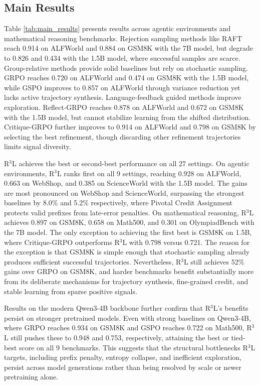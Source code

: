 \documentclass{article} %
\theoremstyle{definition}
\theoremstyle{remark}
\begin{document}
\subsection{Main Results}
Table \ref{tab:main_results} presents results across agentic environments and mathematical reasoning benchmarks. Rejection sampling methods like RAFT reach 0.914 on ALFWorld and 0.884 on GSM8K with the 7B model, but degrade to 0.826 and 0.434 with the 1.5B model, where successful samples are scarce. Group-relative methods provide solid baselines but rely on stochastic sampling. GRPO reaches 0.720 on ALFWorld and 0.474 on GSM8K with the 1.5B model, while GSPO improves to 0.857 on ALFWorld through variance reduction yet lacks active trajectory synthesis. Language-feedback guided methods improve exploration. Reflect-GRPO reaches 0.878 on ALFWorld and 0.672 on GSM8K with the 1.5B model, but cannot stabilize learning from the shifted distribution. Critique-GRPO further improves to 0.914 on ALFWorld and 0.798 on GSM8K by selecting the best refinement, though discarding other refinement trajectories limits signal diversity.

R$^3$L achieves the best or second-best performance on all 27 settings. On agentic environments, R$^3$L ranks first on all 9 settings, reaching 0.928 on ALFWorld, 0.663 on WebShop, and 0.385 on ScienceWorld with the 1.5B model. The gains are most pronounced on WebShop and ScienceWorld, surpassing the strongest baselines by 8.0\% and 5.2\% respectively, where Pivotal Credit Assignment protects valid prefixes from late-error penalties. On mathematical reasoning, R$^3$L achieves 0.897 on GSM8K, 0.658 on Math500, and 0.301 on OlympiadBench with the 7B model. The only exception to achieving the first best is GSM8K on 1.5B, where Critique-GRPO outperforms R$^3$L with 0.798 versus 0.721. The reason for the exception is that GSM8K is simple enough that stochastic sampling already produces sufficient successful trajectories. Nevertheless, R$^3$L still achieves 52\% gains over GRPO on GSM8K, and harder benchmarks benefit substantially more from its deliberate mechanisms for trajectory synthesis, fine-grained credit, and stable learning from sparse positive signals.

Results on the modern Qwen3-4B backbone further confirm that R$^3$L's benefits persist on stronger pretrained models. Even with strong baselines on Qwen3-4B, where GRPO reaches 0.934 on GSM8K and GSPO reaches 0.722 on Math500, R$^3$L still pushes these to 0.948 and 0.753, respectively, attaining the best or tied-best score on all 9 benchmarks. This suggests that the structural bottlenecks R$^3$L targets, including prefix penalty, entropy collapse, and inefficient exploration, persist across model generations rather than being resolved by scale or newer pretraining alone.
\end{document}

